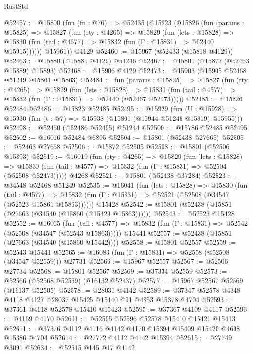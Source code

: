 \begin{lexlean}{RustStd}
\begin{coremodule}
@52457 := @15800
    (fun (fn : @76) =>
    @52435
      (@15823
        (@15826
          (fun (params : @15825) =>
          @15827
            (fun (rty : @4265) =>
            @15829
              (fun (lets : @15828) =>
              @15830 (fun (tail : @4577) => @15832 (fun (Γ : @15831) => @52440 @15915))))))
        @15961))
    @4129
@52460 := @15967 (@52433 (@15818 @4129))
@52463 := @15880 (@15881 @4129) @51246
@52467 := @15801 (@15872 (@52463 @15889) @15893)
@52468 := @15906 @4129
@52473 := @15903 (@15905 @52468 @51249 @15861 @15863)
@52484 := fun (params : @15825) =>
  @15827
    (fun (rty : @4265) =>
    @15829
      (fun (lets : @15828) =>
      @15830 (fun (tail : @4577) => @15832 (fun (Γ : @15831) => @52440 (@52467 @52473)))))
@52485 := @15826 @52484
@52486 := @15823 @52485
@52495 := @15929
    (fun (U : @15928) => @15930 (fun (t : @7) => @15938 (@15801 (@15944 @51246 @15819) @15955)))
@52498 := @52460 (@52486 @52495) @51244
@52500 := @15786 @52485 @52495
@52502 := @16016 @52484 @6895
@52504 := @15801 (@52438 @27665)
@52505 := @52463 @27668
@52506 := @15872 @52505
@52508 := @15801 (@52506 @15893)
@52519 := @16019
    (fun (rty : @4265) =>
    @15829
      (fun (lets : @15828) =>
      @15830 (fun (tail : @4577) => @15832 (fun (Γ : @15831) => @52504 (@52508 @52473)))))
    @4268
@52521 := @15801 (@52438 @37284)
@52523 := @34548 @52468 @51249
@52535 := @16041
    (fun (lets : @15828) =>
    @15830
      (fun (tail : @4577) =>
      @15832 (fun (Γ : @15831) => @52521 (@52508 (@34547 (@52523 @15861 @15863))))))
    @15428
@52542 := @15801 (@52438 (@15851 (@27663 (@34540 (@15860 (@15429 @15863))))))
@52543 := @52523 @15428
@52552 := @16065
    (fun (tail : @4577) => @15832 (fun (Γ : @15831) => @52542 (@52508 (@34547 (@52543 @15863)))))
    @15441
@52557 := @52438 (@15851 (@27663 (@34540 (@15860 @15442))))
@52558 := @15801 @52557
@52559 := @52543 @15441
@52565 := @16083 (fun (Γ : @15831) => @52558 (@52508 (@34547 @52559))) @27731
@52566 := @15967 @52557
@52567 := @52506 @27734
@52568 := @15801 @52567
@52569 := @37334 @52559
@52573 := @52566 (@52568 @52569) (@16132 @52437)
@52577 := @15967 @52567 @52569 (@16137 @52505)
@52578 := @28031 @4142
@52589 := @37347 @52578 @4348 @4118 @4127 @28037 @15425 @15440 @91 @4853 @15378 @4704
@52593 := @37361 @4118 @52578 @15410 @15423
@52595 := @37367 @4109 @4117
@52596 := @4169 @4170
@52601 := @52595 @52596 @52578 @15410 @15421 @15413
@52611 := @37376 @4112 @4116 @4142 @4170 @15394 @15409 @15420 @4698 @15386 @4704
@52614 := @27772 @4112 @4142 @15394
@52615 := @27749 @3091
@52634 := @52615
    @145
    @17
    @4142

\end{coremodule}
\end{lexlean}
